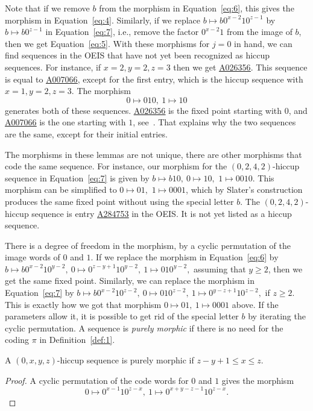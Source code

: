 \documentclass[12pt,reqno]{article}
\newcommand{\seqnum}[1]{\href{https://oeis.org/#1}{\rm \underline{#1}}}
\begin{document}
Note that if we remove $b$ from the morphism in Equation~\ref{eq:6}, this gives the morphism
in Equation~\ref{eq:4}. Similarly, if we replace $b\mapsto b0^{x-2}10^{z-1}$ by $b\mapsto b0^{z-1}$
in Equation~\ref{eq:7},
i.e., remove the factor $0^{x-2}1$ from the image of $b$, then we get Equation~\ref{eq:5}. 
With these morphisms for $j=0$ in hand, we can find sequences 
in the OEIS that have not yet been recognized as hiccup sequences. For instance, if $x=2, y=2, z=3$
then we get \seqnum{A026356}. This sequence is equal to \seqnum{A007066}, except for the first entry,
which is the hiccup sequence with $x=1, y=2, z=3$. 
The morphism
\begin{equation}\label{eq:010}
0\mapsto 010,\ 1\mapsto 10
\end{equation}
generates both of these sequences. 
\seqnum{A026356} is the fixed point starting with $0$, and \seqnum{A007066} is the one starting with $1$,
see~\cite[Exercise 6.1.25]{fogg}. That explains why the two sequences are the same, except for their initial entries.

The morphisms in these lemmas are not unique, there are other morphisms that code the same sequence. 
For instance, our morphism for the $(0,2,4,2)$-hiccup sequence in Equation~\ref{eq:7}
is given by $b\mapsto b10,\ 0\mapsto 10,$ $1\mapsto 0010$. This morphism can be simplified to
 $0\mapsto 01,$ $1\mapsto 0001$, which by Slater's construction produces the same fixed point 
 without using the special letter $b$. The $(0,2,4,2)$-hiccup sequence is entry \seqnum{A284753} in the OEIS. It is not yet listed as a hiccup sequence. 
 
 There is a degree of freedom in the morphism, by a cyclic permutation of the
 image words of $0$ and $1$. If
 we replace the morphism in Equation~\ref{eq:6} by $b\mapsto b0^{x-2}10^{y-2},\ 0\mapsto 0^{z-y+1}10^{y-2},\ 1\mapsto 010^{y-2},$ assuming that $y\geq 2$, then we get the same fixed point.
 Similarly, we can replace the morphism in Equation~\ref{eq:7} by
 $b\mapsto b0^{x-2}10^{z-2},\ 0\mapsto 010^{z-2},\ 1\mapsto 0^{y-z+1}10^{z-2},$
 if $z\geq 2$. This is exactly how we got that morphism $0\mapsto 01,\ 1\mapsto 0001$ above.
 If the parameters allow it, it is possible to get rid of the special letter $b$ by
 iterating the cyclic permutation. A sequence is \emph{purely morphic} if
 there is no need for the coding $\pi$ in Definition~\ref{def:1}.

\begin{lemma}\label{lem:pure}
    A $(0,x,y,z)$-hiccup sequence is purely morphic if $z-y+1\leq x\leq z$.
\end{lemma}
\begin{proof}
    A cyclic permutation of the code words for $0$ and $1$ gives the morphism
    \begin{equation}\label{eq:6b}
    0\mapsto 0^{x-1}10^{z-x},\ 1\mapsto 0^{x+y-z-1}10^{z-x}.
    \end{equation}
\end{proof}
\end{document}
